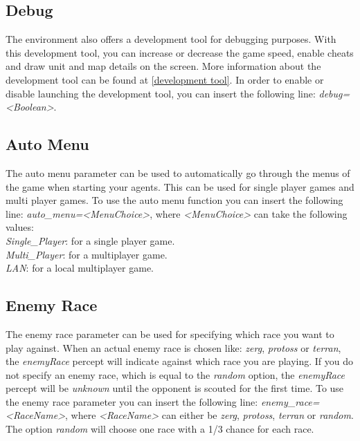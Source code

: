 \subsection{Debug}
\label{debug}
The environment also offers a development tool for debugging purposes. With this development tool, you can increase or decrease the game speed, enable cheats and draw unit and map details on the screen. More information about the development tool can be found at \ref{development tool}. In order to enable or disable launching the development tool, you can insert the following line: \textit{debug=<Boolean>}.

\subsection{Auto Menu}
\label{auto menu}
The auto menu parameter can be used to automatically go through the menus of the game when starting your agents. This can be used for single player games and multi player games. To use the auto menu function you can insert the following line: \textit{auto\_menu=<MenuChoice>}, where \textit{<MenuChoice>} can take the following values:\\
\textit{Single\_Player}: for a single player game.\\
\textit{Multi\_Player}: for a multiplayer game.\\
\textit{LAN}: for a local multiplayer game.

\subsection{Enemy Race}
\label{enemy race}
The enemy race parameter can be used for specifying which race you want to play against. When an actual enemy race is chosen like: \textit{zerg}, \textit{protoss} or \textit{terran}, the \textit{enemyRace} percept will indicate against which race you are playing. If you do not specify an enemy race, which is equal to the \textit{random} option, the \textit{enemyRace} percept will be \textit{unknown} until the opponent is scouted for the first time. To use the enemy race parameter you can insert the following line: \textit{enemy\_race=<RaceName>}, where \textit{<RaceName>} can either be \textit{zerg}, \textit{protoss}, \textit{terran} or \textit{random}. The option \textit{random} will choose one race with a 1/3 chance for each race.


